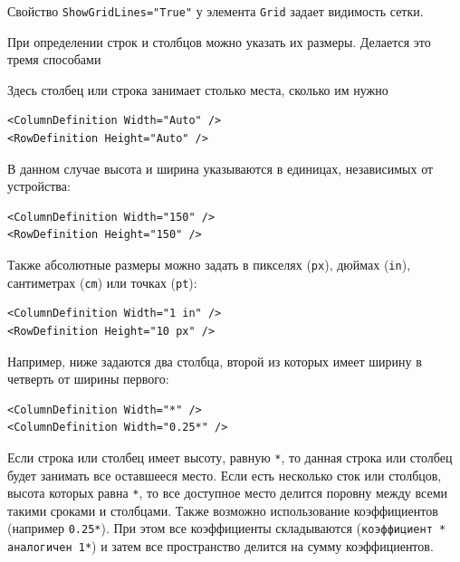 Свойство \texttt{ShowGridLines="True"} у элемента \texttt{Grid} задает видимость сетки.

При определении строк и столбцов можно указать их размеры. Делается это тремя способами

\begin{description}[style=nextline]
\item [Автоматические размеры] Здесь столбец или строка занимает столько места, сколько им нужно

\begin{verbatim}
<ColumnDefinition Width="Auto" />
<RowDefinition Height="Auto" />
\end{verbatim}

\item [Абсолютные размеры] В данном случае высота и ширина указываются в единицах, независимых от устройства:

\begin{verbatim}
<ColumnDefinition Width="150" />
<RowDefinition Height="150" />
\end{verbatim}

Также абсолютные размеры можно задать в пикселях (\texttt{px}), дюймах (\texttt{in}), сантиметрах (\texttt{cm}) или точках (\texttt{pt}):

\begin{verbatim}
<ColumnDefinition Width="1 in" />
<RowDefinition Height="10 px" />
\end{verbatim}

\item [Пропорциональные размеры] Например, ниже задаются два столбца, второй из которых имеет ширину в четверть от ширины первого:

\begin{verbatim}
<ColumnDefinition Width="*" />
<ColumnDefinition Width="0.25*" />
\end{verbatim}

\end{description}


Если строка или столбец имеет высоту, равную \texttt{*}, то данная строка или столбец будет занимать все оставшееся место. Если есть несколько сток или столбцов, высота которых равна \texttt{*}, то все доступное место делится поровну между всеми такими сроками и столбцами. Также возможно использование коэффициентов (например \texttt{0.25*}). При этом все коэффициенты складываются (\texttt{коэффициент * аналогичен 1*}) и затем все пространство делится на сумму коэффициентов.

